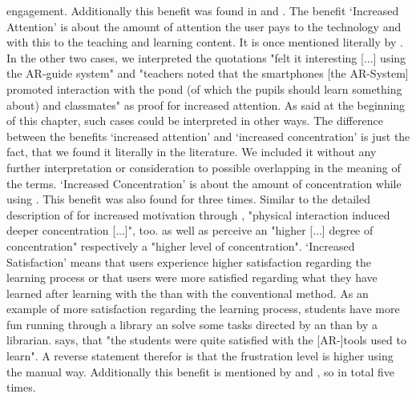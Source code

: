 engagement.\autocite[cf.][8]{Iwata.2011} Additionally this benefit was found in \cite{Li.2011} and \cite{Hou.2013}.\autocite[cf.][322]{Li.2011}\mulcit\autocite[cf.][448]{Hou.2013}
The benefit ‘Increased Attention’ is about the amount of attention the user pays to the technology and with this to the teaching and learning content. It is once mentioned literally by \cite{VateULan.2012}.\autocite[cf.][894]{VateULan.2012} In the other two cases, we interpreted the quotations "felt it interesting [...] using the AR-guide system"\autocite[194]{Chen.2008} and 
"teachers noted that the smartphones [the AR-System] promoted interaction with the pond (of which the pupils should learn something about) and classmates"\autocite[552]{Kamarainen.2013} as proof for 
increased attention. As said at the beginning of this chapter, such cases could be interpreted in other ways.
The difference between the benefits ‘increased attention’ and ‘increased concentration’ is just the fact, that we found it literally in the literature. We included it
without any further interpretation or consideration to possible overlapping in the meaning of the terms.
‘Increased Concentration’ is about the amount of concentration while using \AR \appsns. This benefit was also found for three times. Similar to the detailed description of \cite{Iwata.2011} for increased motivation through \AR \appns, "physical interaction
induced deeper concentration [...]"\autocite[9]{Iwata.2011}, too. \cite{Yen.2013} as well as \cite{Ibanez.2014} perceive an "higher [...] degree of concentration"\autocite[173]{Yen.2013} respectively a 
"higher level of concentration"\autocite[11]{Ibanez.2014}. 
‘Increased Satisfaction’ means that users experience higher satisfaction regarding the learning process or that users were more satisfied regarding what they have learned after learning with the \AR \app than with the 
conventional method. As an example of more satisfaction regarding the learning process, students have more fun running through a library an solve some tasks directed by an \AR \app than by a librarian\autocite[649]{Chen.2012}.
\cite{MartinGutierrez.2013} says, that "the students were quite satisfied with the [AR-]tools used to learn"\autocite[6]{MartinGutierrez.2013}. A reverse statement therefor is that the frustration level is higher using the 
manual way\autocite[cf.][448]{Hou.2013}. Additionally this benefit is mentioned by \cite{Ibanez.2014} and \cite{Redondo.2013}, so in total five times.

